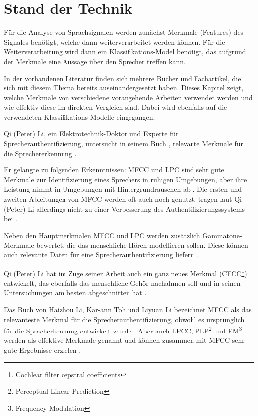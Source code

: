 \section{Stand der Technik}

Für die Analyse von Sprachsignalen werden zunächst Merkmale (Features) des Signales benötigt, welche dann weiterverarbeitet werden können.
Für die Weiterverarbeitung wird dann ein Klassifikations-Model benötigt, das aufgrund der Merkmale eine Aussage über den Sprecher treffen kann.

In der vorhandenen Literatur finden sich mehrere Bücher und Fachartikel, die sich mit diesem Thema bereits auseinandergesetzt haben. 
Dieses Kapitel zeigt, welche Merkmale von verschiedene vorangehende Arbeiten verwendet werden und wie effektiv diese im direkten Vergleich sind. Dabei wird ebenfalls auf die verwendeten Klassifikations-Modelle eingegangen.

Qi (Peter) Li, ein Elektrotechnik-Doktor und Experte für Sprecherauthentifizierung, untersucht in seinem Buch , relevante Merkmale für die Sprechererkennung \autocite{li_speaker_2012}.

Er gelangte zu folgenden Erkenntnissen:
\ac{MFCC} und \ac{LPC} sind sehr gute Merkmale zur Identifizierung eines Sprechers in ruhigen Umgebungen, aber ihre Leistung nimmt in Umgebungen mit Hintergrundrauschen ab \autocite[vgl.][S. 136]{li_speaker_2012}.
Die ersten und zweiten Ableitungen von \ac{MFCC} werden oft auch noch genutzt, tragen laut Qi (Peter) Li allerdings nicht zu einer Verbesserung des Authentifizierungssystems bei \autocite[vgl.][S. 143]{li_speaker_2012}.

Neben den Hauptmerkmalen \ac{MFCC} und \ac{LPC} werden zusätzlich Gammatone-Merkmale bewertet, die das menschliche Hören modellieren sollen.
Diese können auch relevante Daten für eine Sprecherauthentifizierung liefern \autocite[vgl.][S. 111, 117]{li_speaker_2012}.

Qi (Peter) Li hat im Zuge seiner Arbeit auch ein ganz neues Merkmal (CFCC\footnote{Cochlear filter cepstral coefficients}) entwickelt, das ebenfalls das menschliche Gehör nachahmen soll und in seinen Untersuchungen am besten abgeschnitten hat \autocite[vgl.][S. 135]{li_speaker_2012}.

Das Buch  von Haizhou Li, Kar-ann Toh und Liyuan Li bezeichnet \ac{MFCC} als das relevanteste Merkmal für die Sprecherauthentifizierung, obwohl es ursprünglich für die Spracherkennung entwickelt wurde \autocite[vgl.][S. 7, 51]{li_advanced_nodate}.
Aber auch \ac{LPCC}, PLP\footnote{Perceptual Linear Prediction} und FM\footnote{Frequency Modulation} werden als effektive Merkmale genannt und können zusammen mit \ac{MFCC} sehr gute Ergebnisse erzielen \autocite[vgl.][S. 6, 67]{li_advanced_nodate}.

